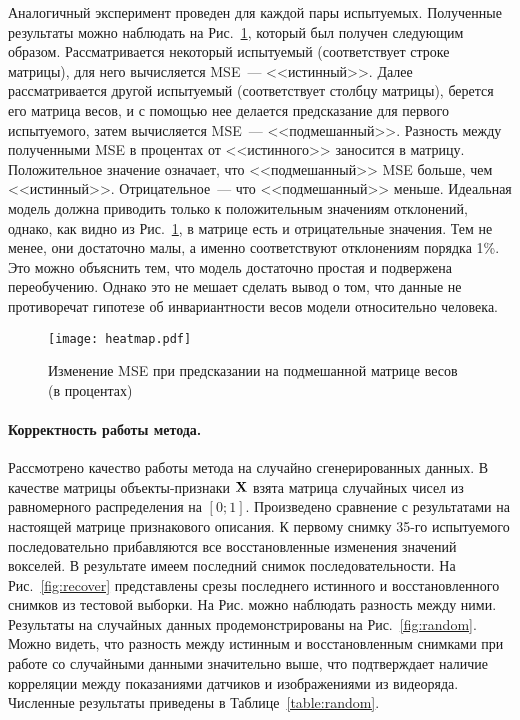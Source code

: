 \documentclass[a4paper, 12pt]{extarticle}
\begin{document}
Аналогичный эксперимент проведен для каждой пары испытуемых.
Полученные результаты можно наблюдать на Рис.~\ref{fig:heatmap},
который был получен следующим образом.
Рассматривается некоторый испытуемый (соответствует строке матрицы), 
для него вычисляется MSE~--- <<истинный>>.
Далее рассматривается другой испытуемый (соответствует столбцу матрицы),
берется его матрица весов, и с помощью нее делается предсказание для первого 
испытуемого, затем вычисляется MSE~--- <<подмешанный>>. 
Разность между полученными MSE в процентах от <<истинного>> заносится в матрицу.
Положительное значение означает, что <<подмешанный>> MSE больше, чем <<истинный>>.
Отрицательное~--- что <<подмешанный>> меньше.
Идеальная модель должна приводить только к положительным значениям отклонений, однако,
как видно из Рис.~\ref{fig:heatmap}, в матрице есть и отрицательные значения.
Тем не менее, они достаточно малы, а именно соответствуют отклонениям порядка 1\%.
Это можно объяснить тем, что модель достаточно простая и подвержена переобучению.
Однако это не мешает сделать вывод о том, что данные не противоречат гипотезе 
об инвариантности весов модели относительно человека.

\begin{figure}[h!]
	\centering
	\texttt{[image: heatmap.pdf]}
	\caption{Изменение MSE при предсказании на подмешанной матрице весов (в процентах)}
	\label{fig:heatmap}
\end{figure}

\paragraph*{Корректность работы метода.}

Рассмотрено качество работы метода на случайно сгенерированных данных. 
В качестве матрицы объекты-признаки $\mathbf{X}$ взята матрица 
случайных чисел из равномерного распределения на $[0; 1]$.
Произведено сравнение с результатами на настоящей матрице признакового описания.
К первому снимку 35-го испытуемого последовательно прибавляются все восстановленные
изменения значений вокселей.
В результате имеем последний снимок последовательности. На Рис.~\ref*{fig:recover}
представлены срезы последнего истинного и восстановленного снимков из тестовой выборки.
На Рис. можно наблюдать разность между ними.
Результаты на случайных данных продемонстрированы на Рис.~\ref*{fig:random}.
Можно видеть, что разность между истинным и восстановленным снимками при работе со случайными данными
значительно выше, что подтверждает наличие корреляции между показаниями датчиков и
изображениями из видеоряда. Численные результаты приведены в Таблице~\ref{table:random}.
\end{document}
